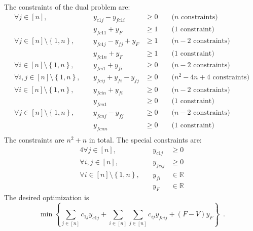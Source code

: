The constraints of the dual problem are:
\begin{equation}
\label{lp:dual:constraints}
\begin{alignedat}{4}
  \forall j \in \left[n\right], && y_{c1j} - y_{fc1i} &\geq 0 &&\mbox{ ($n$ constraints)} \\
  && y_{fc11} + y_F &\geq 1 &&\mbox{ (1 constraint)} \\
  \forall j \in \left[n\right] \setminus \left\{1, n\right\}, &\:& y_{fc1j} - y_{fj} + y_F &\geq 1 &&
    \mbox{ ($n - 2$ constraints)} \\
  && y_{fc1n} + y_F &\geq 1 &&\mbox{ (1 constraint)} \\
  \forall i \in \left[n\right] \setminus \left\{1, n\right\}, && y_{fci1} + y_{fi} &\geq 0 &&
    \mbox{ ($n - 2$ constraints)} \\
  \forall i, j \in \left[n\right] \setminus \left\{1, n\right\}, &\:& y_{fcij} + y_{fi} - y_{fj} &\geq 0 &&
    \mbox{ ($n^2 - 4n + 4$ constraints)} \\
  \forall i \in \left[n\right] \setminus \left\{1, n\right\}, && y_{fcin} + y_{fi} &\geq 0 &&
    \mbox{ ($n - 2$ constraints)} \\
  && y_{fcn1} &\geq 0 &&\mbox{ (1 constraint)} \\
  \forall j \in \left[n\right] \setminus \left\{1, n\right\}, && y_{fcnj} - y_{fj} &\geq 0 &&
    \mbox{ ($n - 2$ constraints)} \\
  && y_{fcnn} &\geq 0 &&\mbox{ (1 constraint)} \\
\end{alignedat}
\end{equation}
The constraints are $n^2 + n$ in total. The special constraints are:
\begin{alignat*}{4}
  \forall j \in \left[n\right], && y_{c1j} &\geq 0 \\
  \forall i, j \in \left[n\right], &\:& y_{fcij} &\geq 0 \\
  \forall i \in \left[n\right] \setminus \left\{1, n\right\}, && y_{fi} &\in \mathbb{R} \\
  && y_F &\in \mathbb{R}
\end{alignat*}
The desired optimization is
\begin{equation*}
  \min{\left\{\sum\limits_{j \in \left[n\right]}c_{1j}y_{c1j} + \sum\limits_{i \in \left[n\right]}\sum\limits_{j \in
       \left[n\right]}c_{ij}y_{fcij} + \left(F - V\right)y_F\right\}} \enspace.
\end{equation*}
